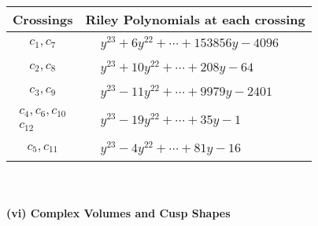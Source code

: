\documentclass[1p]{elsarticle_modified}
\theoremstyle{definition}
\begin{document}
\begin{tabular}{m{50pt}|m{274pt}}
Crossings & \hspace{64pt}Riley Polynomials at each crossing \\
\hline $$\begin{aligned}c_{1},c_{7}\end{aligned}$$&$\begin{aligned}
&y^{23}+6 y^{22}+\cdots+153856 y-4096
\end{aligned}$\\
\hline $$\begin{aligned}c_{2},c_{8}\end{aligned}$$&$\begin{aligned}
&y^{23}+10 y^{22}+\cdots+208 y-64
\end{aligned}$\\
\hline $$\begin{aligned}c_{3},c_{9}\end{aligned}$$&$\begin{aligned}
&y^{23}-11 y^{22}+\cdots+9979 y-2401
\end{aligned}$\\
\hline $$\begin{aligned}c_{4},c_{6},c_{10}\\c_{12}\end{aligned}$$&$\begin{aligned}
&y^{23}-19 y^{22}+\cdots+35 y-1
\end{aligned}$\\
\hline $$\begin{aligned}c_{5},c_{11}\end{aligned}$$&$\begin{aligned}
&y^{23}-4 y^{22}+\cdots+81 y-16
\end{aligned}$\\
\hline
\end{tabular}\\~\\
\newpage\flushleft \textbf{(vi) Complex Volumes and Cusp Shapes}
\end{document}
